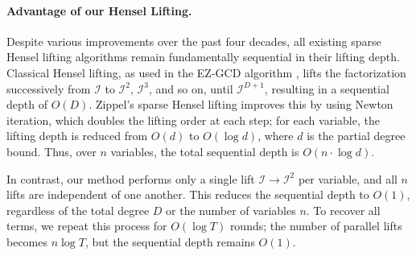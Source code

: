 \documentclass{article}
\numberwithin{equation}{section}
\begin{document}
\paragraph{Advantage of our Hensel Lifting.}
Despite various improvements over the past four decades, all existing sparse Hensel lifting algorithms remain fundamentally sequential in their lifting depth. Classical Hensel lifting, as used in the EZ-GCD algorithm \cite{moses1973}, lifts the factorization successively from $\mathcal{I}$ to $\mathcal{I}^2$, $\mathcal{I}^3$, and so on, until $\mathcal{I}^{D+1}$, resulting in a sequential depth of $O(D)$. Zippel's sparse Hensel lifting \cite{zippel1981} improves this by using Newton iteration, which doubles the lifting order at each step; for each variable, the lifting depth is reduced from $O(d)$ to $O(\log d)$, where $d$ is the partial degree bound. Thus, over $n$ variables, the total sequential depth is $O(n \cdot \log d)$. 

In contrast, our method performs only a single lift $\mathcal{I} \to \mathcal{I}^2$ per variable, and all $n$ lifts are independent of one another. This reduces the sequential depth to $O(1)$, regardless of the total degree $D$ or the number of variables $n$. To recover all terms, we repeat this process for $O(\log T)$ rounds; the number of parallel lifts becomes $n\log T$, but the sequential depth remains $O(1)$.
\end{document}

